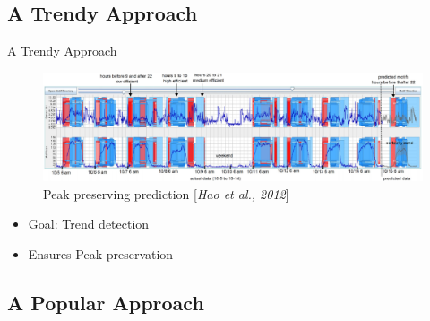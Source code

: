 \documentclass[10pt]{beamer}
\begin{document}

\subsection{A Trendy Approach}
\begin{frame}{A Trendy Approach}
	\centering
	\begin{figure}[htbp]
		\includegraphics[scale=.18]{images/Peak}
		\caption{Peak preserving prediction [\textit{Hao et al., 2012}]}
	\end{figure}
	\begin{itemize}
		\item Goal: Trend detection
		\item Ensures Peak preservation 
	\end{itemize}
\end{frame}

\subsection{A Popular Approach}

\end{document}

